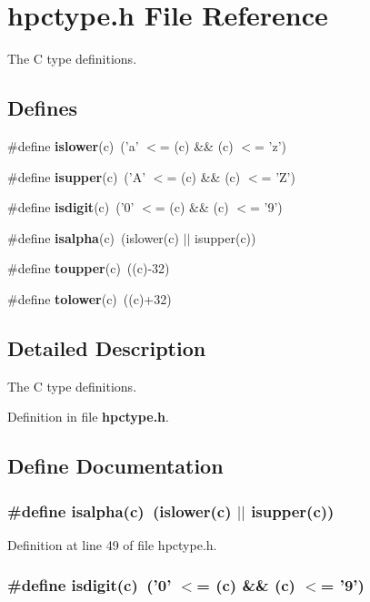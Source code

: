 \section{hpctype.h File Reference}
\label{hpctype_8h}
The C type definitions. 


\subsection*{Defines}
\begin{CompactItemize}
\item 
\#define {\bf islower}(c)\ ('a' $<$= (c) \&\& (c) $<$= 'z')
\item 
\#define {\bf isupper}(c)\ ('A' $<$= (c) \&\& (c) $<$= 'Z')
\item 
\#define {\bf isdigit}(c)\ ('0' $<$= (c) \&\& (c) $<$= '9')
\item 
\#define {\bf isalpha}(c)\ (islower(c) $|$$|$ isupper(c))
\item 
\#define {\bf toupper}(c)\ ((c)-32)
\item 
\#define {\bf tolower}(c)\ ((c)+32)
\end{CompactItemize}


\subsection{Detailed Description}
The C type definitions.





Definition in file {\bf hpctype.h}.

\subsection{Define Documentation}
\subsubsection{\setlength{\rightskip}{0pt plus 5cm}\#define isalpha(c)\ (islower(c) $|$$|$ isupper(c))}\label{hpctype_8h_a3}




Definition at line 49 of file hpctype.h.
\subsubsection{\setlength{\rightskip}{0pt plus 5cm}\#define isdigit(c)\ ('0' $<$= (c) \&\& (c) $<$= '9')}\label{hpctype_8h_a2}




